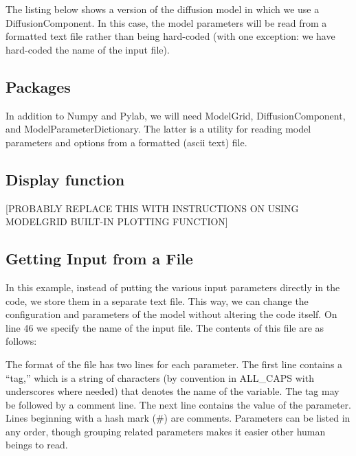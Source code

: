 \documentclass[12pt]{article}
\begin{document}
The listing below shows a version of the diffusion model in which we use a DiffusionComponent. In this case, the model parameters will be read from a formatted text file rather than being hard-coded (with one exception: we have hard-coded the name of the input file).

 

\subsection{Packages}

 

In addition to Numpy and Pylab, we will need ModelGrid, DiffusionComponent, and ModelParameterDictionary. The latter is a utility for reading model parameters and options from a formatted (ascii text) file.

\subsection{Display function}

[PROBABLY REPLACE THIS WITH INSTRUCTIONS ON USING MODELGRID BUILT-IN PLOTTING FUNCTION]

\subsection{Getting Input from a File}



In this example, instead of putting the various input parameters directly in the code, we store them in a separate text file. This way, we can change the configuration and parameters of the model without altering the code itself. On line 46 we specify the name of the input file. The contents of this file are as follows:



The format of the file has two lines for each parameter. The first line contains a ``tag,'' which is a string of characters (by convention in ALL\_CAPS with underscores where needed) that denotes the name of the variable. The tag may be followed by a comment line. The next line contains the value of the parameter. Lines beginning with a hash mark (\#) are comments. Parameters can be listed in any order, though grouping related parameters makes it easier other human beings to read.
\end{document}
